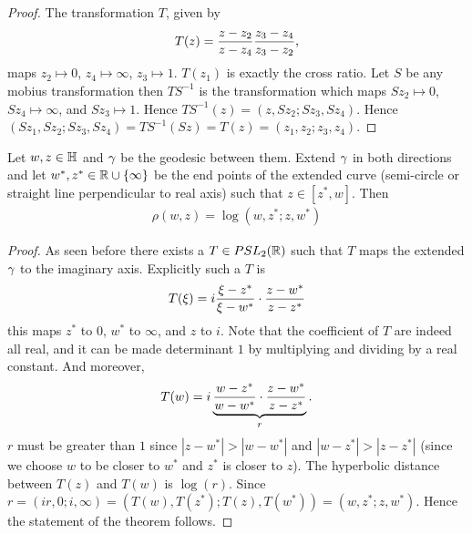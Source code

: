 \begin{proof}
  The transformation $T$, given by
  \begin{align*}
    T(z) = \frac{z-z_2}{z-z_4} \frac{z_3-z_4}{z_3 -z_2},
  \end{align*}
  maps $z_2\mapsto 0$, $z_4\mapsto \infty$, $z_3\mapsto 1$. $T(z_1)$ is exactly the cross ratio. Let $S$ be any mobius transformation then $TS^{-1}$ is the transformation which maps $Sz_2 \mapsto 0$, $Sz_4\mapsto \infty$, and $Sz_3\mapsto 1$. Hence $TS^{-1}(z) = (z,Sz_2; Sz_3, Sz_4)$. Hence $(Sz_1,Sz_2;Sz_3,Sz_4) = TS^{-1}(Sz) = T(z) = (z_1,z_2;z_3,z_4)$.
\end{proof}
\begin{theorem}
  Let $w,z\in \mathbb{H}$ and $\gamma$ be the geodesic between them. Extend $\gamma$ in both directions and let $w^*, z^*\in \mathbb{R}\cup \{\infty\}$ be the end points of the extended curve (semi-circle or straight line perpendicular to real axis) such that $z\in [z^*,w]$. Then
  \begin{align*}
    \rho(w,z) = \log(w,z^*; z,w^*)
  \end{align*}
\end{theorem}
\begin{proof}
  As seen before there exists a $T\in PSL_2(\mathbb{R})$ such that $T$ maps the extended $\gamma$ to the imaginary axis. Explicitly such a $T$ is
  \begin{align*}
    T(\xi) = i\frac{\xi-z^*}{\xi-w^*}\cdot \frac{z-w^*}{z-z^*} 
  \end{align*}
  this maps $z^*$ to $0$, $w^*$ to $\infty$, and $z$ to $i$. Note that the coefficient of $T$ are indeed all real, and it can be made determinant $1$ by multiplying and dividing by a real constant. And moreover,
  \begin{align*}
    T(w) = i\underbrace{\frac{w-z^*}{w-w^*}\cdot \frac{z-w^*}{z-z^*}}_{r}.
  \end{align*}
  $r$ must be greater than $1$ since $|z-w^*|>|w-w^*|$ and $|w-z^*|>|z-z^*|$ (since we choose $w$ to be closer to $w^*$ and $z^*$ is closer to $z$). The hyperbolic distance between $T(z)$ and $T(w)$ is $\log(r)$. Since $r = (ir,0;i,\infty) = (T(w), T(z^*); T(z), T(w^*)) = (w,z^*;z,w^*)$. Hence the statement of the theorem follows. 
\end{proof}

